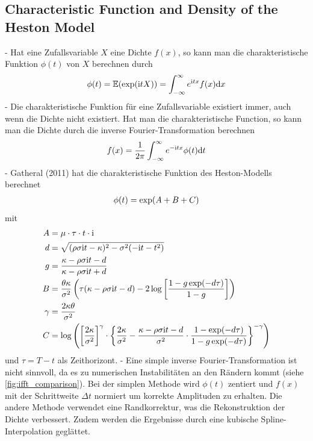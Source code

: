 \subsection{Characteristic Function and Density of the Heston Model}
- Hat eine Zufallsvariable $X$ eine Dichte $f(x)$, so kann man die charakteristische Funktion $\phi(t)$ von $X$ berechnen durch
\begin{align}
    \phi(t) = \mathbb{E}(\exp(\mathrm{i}tX)) = \int_{-\infty}^{\infty} e^{\mathrm{i}tx}f(x)\mathrm{d}x \notag
\end{align}
- Die charakteristische Funktion für eine Zufallsvariable existiert immer, auch wenn die Dichte nicht existiert. Hat man die charakteristische Function, so kann man die Dichte durch die inverse Fourier-Transformation berechnen
\begin{align}
    f(x) = \frac{1}{2\pi}\int_{-\infty}^{\infty} e^{-\mathrm{i}tx}\phi(t)\mathrm{d}t \notag
\end{align}
- Gatheral (2011) hat die charakteristische Funktion des Heston-Modells berechnet
\begin{align}
    \phi(t) = \exp(A + B + C) \notag
\end{align}
mit
\begin{align}
    A &= \mu\cdot\tau\cdot t\cdot\mathrm{i} \notag \\
    d &= \sqrt{(\rho\sigma\mathrm{i}t - \kappa)^2 - \sigma^2(-\mathrm{i}t - t^2)} \notag \\
    g &= \frac{\kappa - \rho\sigma\mathrm{i}t - d}{\kappa - \rho\sigma\mathrm{i}t + d} \notag \\
    B &= \frac{\theta\kappa}{\sigma^2}\left(\tau(\kappa - \rho\sigma\mathrm{i}t - d) - 2\log\left[\frac{1-g\exp(-d\tau)}{1-g}\right]\right) \notag \\
    \gamma &= \frac{2\kappa\theta}{\sigma^2} \notag \\
    C &= \log\left(\left[\frac{2\kappa}{\sigma^2}\right]^{\gamma}\cdot \left\lbrace \frac{2\kappa}{\sigma^2} - \frac{\kappa - \rho\sigma\mathrm{i}t - d}{\sigma^2}\cdot\frac{1 - \exp(-d\tau)}{1-g\exp(-d\tau)} \right\rbrace^{-\gamma}\right) \notag
\end{align}
und $\tau = T-t$ als Zeithorizont.
- Eine simple inverse Fourier-Transformation ist nicht sinnvoll, da es zu numerischen Instabilitäten an den Rändern kommt (siehe \ref{fig:ifft_comparison}). Bei der simplen Methode wird $\phi(t)$ zentiert und $f(x)$ mit der Schrittweite $\Delta t$ normiert um korrekte Amplituden zu erhalten. Die andere Methode verwendet eine Randkorrektur, was die Rekonstruktion der Dichte verbessert. Zudem werden die Ergebnisse durch eine kubische Spline-Interpolation geglättet.

